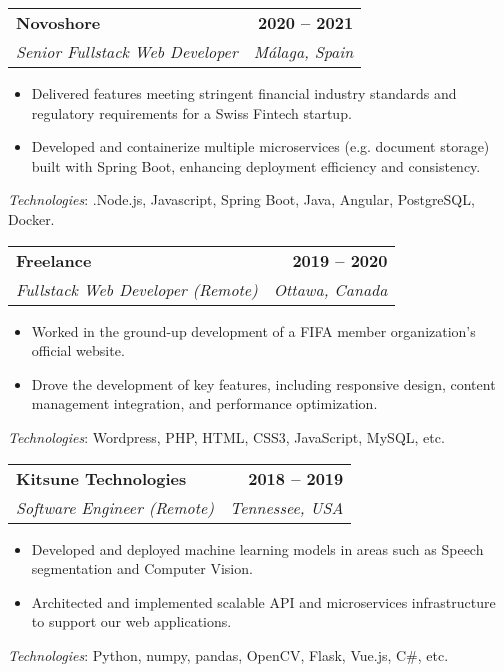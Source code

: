 \documentclass[letterpaper,11pt]{article}
\makeatletter
\newcommand{\resumeItem}[1]{
  \item\small{
    {#1 \vspace{-2pt}}
  }
}
\newcommand{\resumeSubheading}[4]{
  \vspace{-2pt}\item
    \begin{tabular*}{1.0\textwidth}[t]{l@{\extracolsep{\fill}}r}
      \textbf{#1} & \textbf{\small #2} \\
      \textit{\small#3} & \textit{\small #4} \\
    \end{tabular*}\vspace{-7pt}
}
\newcommand{\resumeItemListStart}{\begin{itemize}}
\newcommand{\resumeItemListEnd}{\end{itemize}\vspace{-5pt}}
\makeatother
\begin{document}
    \resumeSubheading
      {Novoshore}{2020 -- 2021}
      {Senior Fullstack Web Developer}{Málaga, Spain}
      \resumeItemListStart
        \resumeItem{Delivered features meeting stringent financial industry standards and regulatory requirements for a Swiss Fintech startup.}
        \resumeItem{Developed and containerize multiple microservices (e.g. document storage) built with Spring Boot, enhancing deployment efficiency and consistency.}
    \resumeItemListEnd
    \begin{itemize}[leftmargin=0.0in, label={}]
      \small{
        \item{
          \emph{Technologies}{: .Node.js, Javascript, Spring Boot, Java, Angular, PostgreSQL, Docker.} \\
        }
      }
    \end{itemize}

    \resumeSubheading
      {Freelance}{2019 -- 2020}
      {Fullstack Web Developer (Remote)}{Ottawa, Canada}
      \resumeItemListStart
        \resumeItem{Worked in the ground-up development of a FIFA member organization's official website.}
        \resumeItem{Drove the development of key features, including responsive design, content management integration, and performance optimization.}
      \resumeItemListEnd
    \begin{itemize}[leftmargin=0.0in, label={}]
      \small{
        \item{
          \emph{Technologies}{:  Wordpress, PHP, HTML, CSS3, JavaScript, MySQL, etc.} \\
        }
      }
    \end{itemize}

    \resumeSubheading
      {Kitsune Technologies}{2018 -- 2019}
      {Software Engineer (Remote)}{Tennessee, USA}
      \resumeItemListStart
        \resumeItem{Developed and deployed machine learning models in areas such as Speech segmentation and Computer Vision.}
        \resumeItem{Architected and implemented scalable API and microservices infrastructure to support our web applications.}
      \resumeItemListEnd
    \begin{itemize}[leftmargin=0.0in, label={}]
      \small{
        \item{
          \emph{Technologies}{: Python, numpy, pandas, OpenCV, Flask, Vue.js, C\#, etc.} \\
        }
      }
    \end{itemize}
\end{document}
